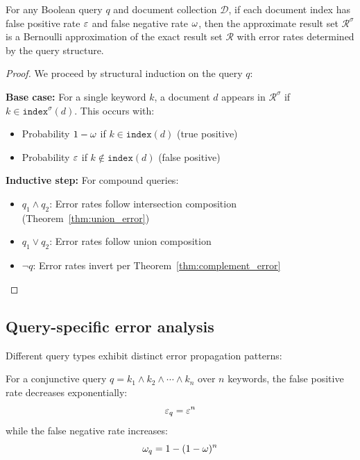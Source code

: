 \documentclass[ ../main.tex]{subfiles}
\begin{document}
\begin{theorem}
\label{thm:approx_search}
For any Boolean query $q$ and document collection $\mathcal{D}$, if each document index has false positive rate $\varepsilon$ and false negative rate $\omega$, then the approximate result set $\mathcal{R}^\sigma$ is a Bernoulli approximation of the exact result set $\mathcal{R}$ with error rates determined by the query structure.
\end{theorem}

\begin{proof}
We proceed by structural induction on the query $q$:

\textbf{Base case:} For a single keyword $k$, a document $d$ appears in $\mathcal{R}^\sigma$ if $k \in \texttt{index}^\sigma(d)$. This occurs with:
\begin{itemize}
\item Probability $1-\omega$ if $k \in \texttt{index}(d)$ (true positive)
\item Probability $\varepsilon$ if $k \notin \texttt{index}(d)$ (false positive)
\end{itemize}

\textbf{Inductive step:} For compound queries:
\begin{itemize}
\item $q_1 \land q_2$: Error rates follow intersection composition (Theorem~\ref{thm:union_error})
\item $q_1 \lor q_2$: Error rates follow union composition
\item $\neg q$: Error rates invert per Theorem~\ref{thm:complement_error}
\end{itemize}
\end{proof}

\subsection{Query-specific error analysis}

Different query types exhibit distinct error propagation patterns:

\begin{theorem}
For a conjunctive query $q = k_1 \land k_2 \land \cdots \land k_n$ over $n$ keywords, the false positive rate decreases exponentially:
\begin{equation}
\varepsilon_q = \varepsilon^n
\end{equation}
while the false negative rate increases:
\begin{equation}
\omega_q = 1 - (1-\omega)^n
\end{equation}
\end{theorem}
\end{document}
